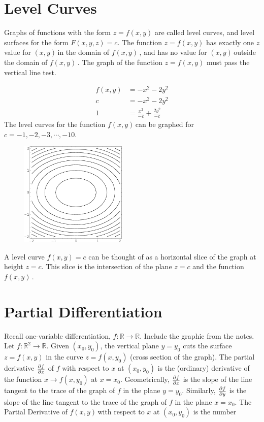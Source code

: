 \documentclass{article}
\newcommand{\n}{\leavevmode \newline} %
\newcommand{\nn}{\leavevmode \newline \newline} %
\newcommand{\R}{\mathbb{R}} %
\newcommand{\xy}{$(x,y)\,$} %
\newcommand{\fxy}{$f(x,y)\,$} %
\numberwithin{equation}{subsection} %
\begin{document}
\section{Level Curves}
Graphs of functions with the form $z=f(x,y)$ are called level curves, and level surfaces for the form $F(x,y,z)=c$. The function $z=f(x,y)$ has exactly one $z$ value for \xy in the domain of \fxy, and has no value for \xy outside the domain of \fxy. The graph of the function $z=f(x,y)$ must pass the vertical line test.

\begin{equation}
    \begin{split}
        f(x,y)&=-x^2-2y^2\\
        c&=-x^2-2y^2\\
        1&=\frac{x^2}{-c}+\frac{2y^2}{-c}
    \end{split}
\end{equation}
\n
The level curves for the function \fxy can be graphed for $c=-1,-2,-3,\cdots,-10$.

\begin{figure}[H]
    \centering
    \includegraphics[width=2in]{levelCurves.png}
\end{figure}
\n
A level curve $f(x,y)=c$ can be thought of as a horizontal slice of the graph at height $z=c$. This slice is the intersection of the plane $z=c$ and the function \fxy.
\section{Partial Differentiation}
Recall one-variable differentiation, $f:\R\rightarrow\R$. Include the graphic from the notes.
\nn
Let $f:\R^2\rightarrow\R$. Given $(x_0,y_0)$, the vertical plane $y=y_0$ cuts the surface $z=f(x,y)$ in the curve $z=f(x,y_0)$ (cross section of the graph). The partial derivative $\pdv{f}{x}$ of $f$ with respect to $x$ at $(x_0,y_0)$ is the (ordinary) derivative of the function $x\rightarrow f(x,y_0)$ at $x=x_0$. Geometrically, $\pdv{f}{x}(x_0,y_0)$ is the slope of the line tangent to the trace of the graph of $f$ in the plane $y=y_0$. Similarly, $\pdv{f}{y}(x_0,y_0)$ is the slope of the line tangent to the trace of the graph of $f$ in the plane $x=x_0$.
\nn
The Partial Derivative of \fxy with respect to $x$ at $(x_0,y_0)$ is the number
\end{document}
